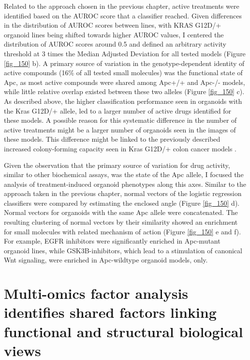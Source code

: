 \begin{flushleft}
\smallbreak
Related to the approach chosen in the previous chapter, active treatments were identified based on the AUROC score that a classifier reached. Given differences in the distribution of AUROC scores between lines, with KRAS G12D/+ organoid lines being shifted towards higher AUROC values, I centered the distribution of AUROC scores around 0.5 and defined an arbitrary activity threshold at 3 times the Median Adjusted Deviation for all tested models (Figure \ref{fig_150} b). A primary source of variation in the genotype-dependent identity of active compounds (16\% of all tested small molecules) was the functional state of Apc, as most active compounds were shared among Apc+/+ and Apc-/- models, while little relative overlap existed between these two alleles (Figure \ref{fig_150} c). As described above, the higher classification performance seen in organoids with the Kras G12D/+ allele, led to a larger number of active drugs identified for these models. A possible reason for this systematic difference in the number of active treatments might be a larger number of organoids seen in the images of these models. This difference might be linked to the previously described increased colony-forming capacity seen in Kras G12D/+ colon cancer models \cite{Patankar2019-ee}.

\smallbreak
Given the observation that the primary source of variation for drug activity, similar to other biochemical assays, was the state of the Apc allele, I focused the analysis of treatment-induced organoid phenotypes along this axes. Similar to the approach taken in the previous chapter, normal vectors of the logistic regression classifiers were compared by estimating the enclosed angle (Figure \ref{fig_150} d). Normal vectors for organoids with the same Apc allele were concatenated. The resulting clustering of normal vectors by their similarity showed an enrichment for small molecules with related mechanism of action (Figure \ref{fig_150} e and f). For example, EGFR inhibitors were significantly enriched in Apc-mutant organoid lines, while GSK3B-inhibitors, which lead to a stimulation of canonical Wnt signaling, were enriched in Apc-wildtype organoid models, only. 

\section{Multi-omics factor analysis identifies shared factors linking functional and structural biological views}


\end{flushleft}
